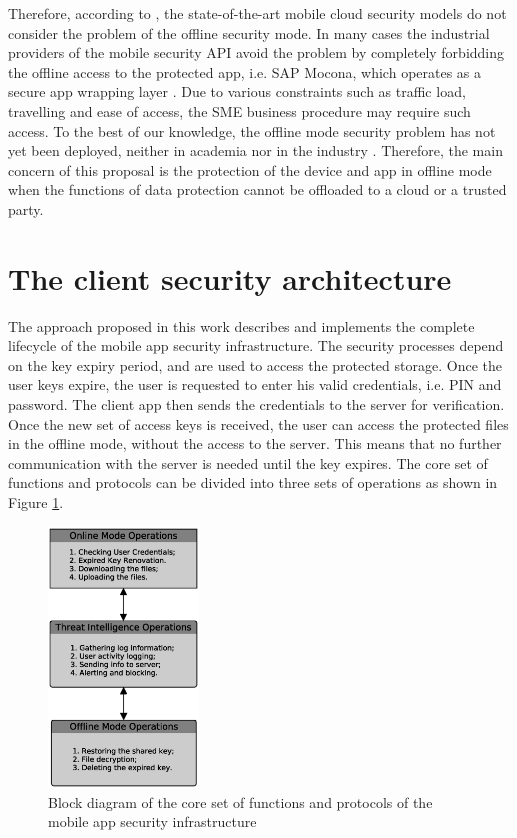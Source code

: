 \documentclass[twocolumn]{svjour3}          %
\begin{document}
Therefore, according to \cite{khan2015cloud, tenorio2013greatest, khan2013towards}, the state-of-the-art mobile cloud security models do not consider the problem of the offline security mode. In many cases the industrial providers of the mobile security API avoid the problem by completely forbidding the offline access to the protected app, i.e. SAP Mocona, which operates as a secure app wrapping layer \cite{Lelyveld2013}. Due to various constraints such as traffic load, travelling and ease of access, the SME business procedure may require such access. To the best of our knowledge, the offline mode security problem has not yet been deployed, neither in academia nor in the industry \cite{yovel2014, khan2015cloud, khan2014survey, khan2013towards}. Therefore, the main concern of this proposal is the protection of the device and app in offline mode when the functions of data protection cannot be offloaded to a cloud or a trusted party. 

\section{The client security architecture}
\label{sec_the_client_security_architecture}
The approach proposed in this work describes and implements the complete lifecycle of the mobile app security infrastructure. The security processes depend on the key expiry period, and are used to access the protected storage. Once the user keys expire, the user is requested to enter his valid credentials, i.e. PIN and password. The client app then sends the credentials to the server for verification. Once the new set of access keys is received, the user can access the protected files in the offline mode, without the access to the server. This means that no further communication with the server is needed until the key expires. The core set of functions and protocols can be divided into three sets of operations as shown in Figure \ref{fig:1}.

\begin{figure}[h!]
	\centering
	\includegraphics[width=4cm]{figures/coresetoffunctionsandprotocols.eps}
	\caption{Block diagram of the core set of functions and protocols of the mobile app security infrastructure}
	\label{fig:1}
\end{figure}
\end{document}
